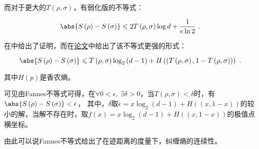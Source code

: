 而对于更大的$T\left(\rho,\sigma\right)$，有弱化版的不等式：

\begin{equation}
\abs{S\left(\rho\right) - S\left(\sigma\right)} \leqslant 2 T\left(\rho,\sigma\right)\log d + \frac{1}{e\ln 2}~.
\end{equation}

在\cite{量子信息}中给出了证明，而在\href{https://arxiv.org/pdf/quant-ph/0610146.pdf}{论文}中给出了该不等式更强的形式：

\begin{equation}
\abs{S\left(\rho\right) - S\left(\sigma\right)} \leqslant T\left(\rho,\sigma\right)\log_2\left(d-1\right) + H\left(\left(T\left(\rho,\sigma\right),1-T\left(\rho,\sigma\right)\right)\right)~.
\end{equation}

其中$H(p)$是香农熵。

可见由Fannes不等式可得，在$\forall 0<\epsilon,~\exists \delta>0$，当$T\left(\rho,\sigma\right)<\delta$时，有$\abs{S\left(\rho\right) - S\left(\sigma\right)}<\epsilon$，
其中，$\delta$取$\epsilon = x\log_2\left(d-1\right) + H\left(\left(x,1-x\right)\right)$的较小的解，当解不存在时，取$f(x)=x\log_2\left(d-1\right) + H\left(\left(x,1-x\right)\right)$的极值点横坐标。

由此可以说Fannes不等式给出了在迹距离的度量下，纠缠熵的连续性。